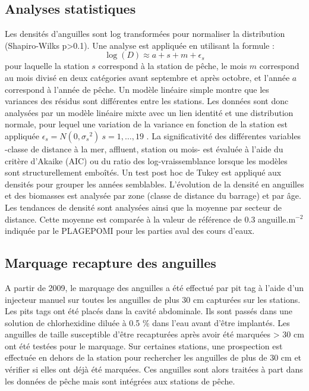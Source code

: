 \documentclass[10pt,twocolumn,titlepage,twoside]{article}\usepackage[]{graphicx}\usepackage[]{color}
\begin{document}
\subsection{Analyses statistiques}
Les densités d'anguilles sont log transformées pour
normaliser la distribution (Shapiro-Wilks p{\textgreater}0.1). Une
analyse est appliquée en utilisant la formule :
\begin{equation*}
\log (D){\approx}a+s+m+\epsilon_s
\end{equation*}
pour laquelle la station $s$ correspond à la station de pêche, le mois $m$
correspond au mois divisé en deux catégories avant septembre et après octobre,
et l'année $a$ correspond à l'année de pêche. Un modèle linéaire simple montre
que les variances des résidus sont différentes entre les stations. Les
 données sont donc analysées par un modèle linéaire mixte
 \citep{pinheiro_nlme_2013} avec un lien identité et une distribution normale, 
 pour lequel une variation de la variance en fonction de la station est appliquée $\epsilon_s=N(0,{\sigma_{s}}^2)
~s=1,\dots,19$ \citep{zuur_mixed_2009}. La significativité des différentes
variables -classe de distance à la mer, affluent, station ou mois- est évaluée à
l'aide du critère d'Akaike (AIC) ou du ratio des log-vraissemblance lorsque les modèles sont structurellement emboîtés. Un test
post hoc de Tukey est appliqué aux densités pour grouper les années semblables.
L'évolution de la densité en anguilles et des biomasses est analysée par zone (classe de
distance du barrage) et par âge. Les tendances de densité sont analysées ainsi
que la moyenne par secteur de distance. Cette moyenne est comparée à la valeur de référence de 0.3
anguille.m$^{-2}$ indiquée par le PLAGEPOMI pour les parties aval des cours
d'eaux.
\subsection{Marquage recapture des anguilles}
A partir de 2009, le marquage des anguilles a été effectué par pit tag à l'aide
d'un injecteur manuel sur toutes les anguilles de plus 30 cm capturées sur les stations. Les
pits tags ont été placés dans la cavité abdominale.
Ils sont passés dans une solution de chlorhexidine diluée à 0.5 \% dans l'eau 
avant d'être
implantés.
Les anguilles de taille susceptible d'être recapturées après avoir été marquées > 30 cm ont été testées pour le marquage. 
Sur certaines stations, une prospection est effectuée en dehors de la station
pour rechercher les anguilles de plus de 30 cm et vérifier si elles ont déjà
été marquées.
Ces anguilles sont alors traitées à part dans les données de pêche mais sont intégrées aux stations de pêche.
\end{document}
